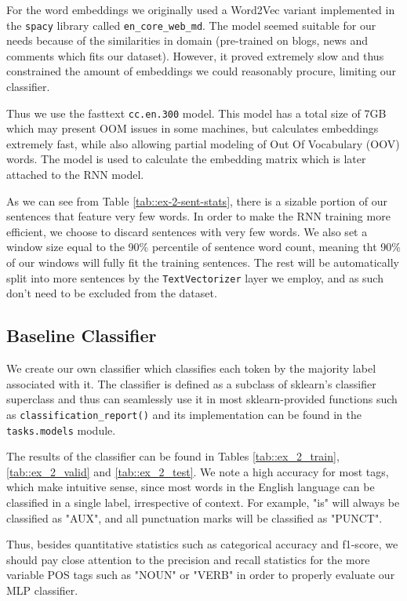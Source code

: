 \documentclass[10pt, a4paper]{article}
\begin{document}
	For the word embeddings we originally used a Word2Vec variant implemented in the \texttt{spacy} library called \texttt{en\_core\_web\_md}. The model seemed suitable for our needs because of the similarities in domain (pre-trained on blogs, news and comments which fits our dataset). However, it proved extremely slow and thus constrained the amount of embeddings we could reasonably procure, limiting our classifier.
	
	Thus we use the fasttext \texttt{cc.en.300} model. This model has a total size of 7GB which may present OOM issues in some machines, but calculates embeddings extremely fast, while also allowing partial modeling of Out Of Vocabulary (OOV) words. The model is used to calculate the embedding matrix which is later attached to the RNN model.
	
	As we can see from Table \ref{tab::ex-2-sent-stats}, there is a sizable portion of our sentences that feature very few words. In order to make the RNN training more efficient, we choose to discard sentences with very few words. We also set a window size equal to the 90\% percentile of sentence word count, meaning tht 90\% of our windows will fully fit the training sentences. The rest will be automatically split into more sentences by the \texttt{TextVectorizer} layer we employ, and as such don't need to be excluded from the dataset.
	
	\subsection{Baseline Classifier}
	
	We create our own classifier which classifies each token by the majority label associated with it. The classifier is defined as a subclass of sklearn's classifier superclass and thus can seamlessly use it in most sklearn-provided functions such as \texttt{classification\_report()} and its implementation can be found in the \texttt{tasks.models} module.
	
	The results of the classifier can be found in Tables \ref{tab::ex_2_train}, \ref{tab::ex_2_valid} and \ref{tab::ex_2_test}. We note a high accuracy for most tags, which make intuitive sense, since most words in the English language can be classified in a single label, irrespective of context. For example, "is" will always be classified as "AUX", and all punctuation marks will be classified as "PUNCT".
	
	Thus, besides quantitative statistics such as categorical accuracy and f1-score, we should pay close attention to the precision and recall statistics for the more variable POS tags such as "NOUN" or "VERB" in order to properly evaluate our MLP classifier.
	
\end{document}

